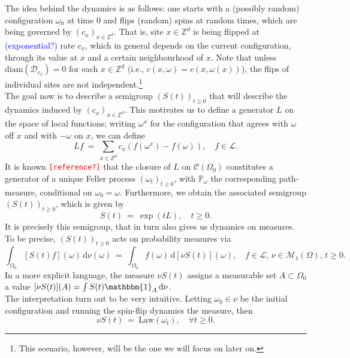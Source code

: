 \documentclass[12pt]{article}
\newcommand{\D}{\mathcal{D}}
\renewcommand{\d}{\mathrm{d}}
\newcommand{\Loc}{\mathcal{L}}
\newcommand{\M}{\mathcal{M}}
\renewcommand{\P}{\mathbb{P}}
\newcommand{\Z}{\mathbb{Z}}
\newcommand{\Law}{\mathrm{Law}}
\newcommand{\1}{\mathbbm{1}}
\newcommand{\5}{\vspace{0.5cm}}
\theoremstyle{definition}
\begin{document}
The idea behind the dynamics is as follows: one starts with a (possibly random) configuration $\omega_0$ at time $0$ and flips (random) spins at random times, which are being governed by $(c_x)_{x\in\Z^d}$. That is, site $x\in\Z^d$ is being flipped at \textcolor{blue}{(exponential?)} rate $c_x$, which in general depends on the current configuration, through its value at $x$ and a certain neighbourhood of $x$. Note that unless $\mathrm{diam}(\D_{c_x})=0$ for each $x\in\Z^d$ (i.e., $c(x,\omega)=c(x,\omega(x))$), the flips of individual sites are not independent.\footnote{This scenario, however, will be the one we will focus on later on.} \\

The goal now is to describe a semigroup $(S(t))_{t\geq 0}$ that will describe the dynamics induced by $(c_x)_{x\in\Z^d}$. This motivates us to define a generator $L$ on the space of local functions; writing $\omega^x$ for the configuration that agrees with $\omega$ off $x$ and with $-\omega$ on $x$, we can define
$$Lf ~=~ \sum_{x\in\Z^d}c_x(f(\omega^x)-f(\omega)), \quad f\in\Loc.$$ It is known \textcolor{red}{\texttt{[reference?]}} that the closure of $L$ on $\mathcal{C}(\Omega_0)$ constitutes a generator of a unique Feller process $(\omega_t)_{t\geq 0}$, with $\P_\omega$ the corresponding path-measure, conditional on $\omega_0=\omega$. Furthermore, we obtain the associated semigroup $(S(t))_{t\geq 0}$, which is given by
$$S(t) ~=~ \exp(tL), \quad t\geq 0.$$
It is precisely this semigroup, that in turn also gives us dynamics on measures. To be precise, $(S(t))_{t\geq 0}$ acts on probability measures via	
$$\int_{\Omega_0} [S(t)f](\omega)\,\d\nu(\omega) ~=~ \int_{\Omega_0}f(\omega)\,\d[\nu S(t)](\omega), \quad f\in\Loc,\,\nu\in\M_1(\Omega),\,t\geq 0.$$
In a more explicit language, the measure $\nu S(t)$ assigns a measurable set $A\subset\Omega_0$ a value $[\nu S(t)](A)=\int S(t)\1_A\,\d\nu$. \\

The interpretation turn out to be very intuitive. Letting $\omega_0\in\nu$ be the initial configuration and running the spin-flip dynamics the measure, then
$$\nu S(t) ~=~ \Law(\omega_t), \quad \forall t\geq 0.$$ 
\end{document}
